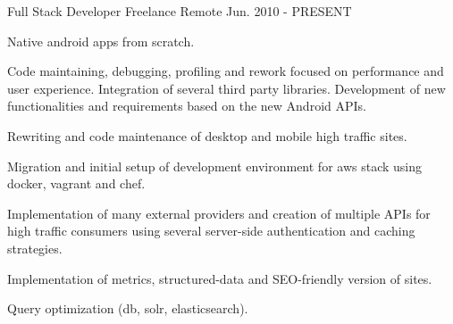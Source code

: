 

\begin{cventries}

  \cventry
    {Full Stack Developer} %
    {Freelance} %
    {Remote} %
    {Jun. 2010 - PRESENT} %
    {
      \begin{cvitems} %
        \item {Native android apps from scratch}. 
        \item {Code maintaining, debugging, profiling and rework focused on performance and user experience. Integration of several third party libraries. Development of new functionalities and requirements based on the new Android APIs.}
        \item {Rewriting and code maintenance of desktop and mobile high traffic sites.}
        \item {Migration and initial setup of development environment for aws stack using docker, vagrant and chef.}
        \item {Implementation of many external providers and creation of multiple APIs for high traffic consumers using several server-side authentication and caching strategies.}
        \item {Implementation of metrics, structured-data and SEO-friendly version of sites.}
        \item {Query optimization (db, solr, elasticsearch)}.
      \end{cvitems}
    }


\end{cventries}
